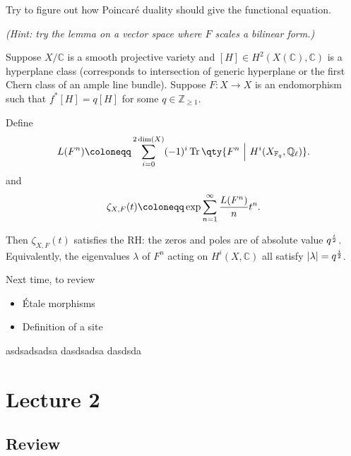 \begin{exercise}

Try to figure out how Poincaré duality should give the functional
equation.

\emph{(Hint: try the lemma on a vector space where \(F\) scales a
bilinear form.)}

\end{exercise}

\begin{theorem}

Suppose \(X/{\mathbb{C}}\) is a smooth projective variety and
\([H] \in H^2(X({\mathbb{C}}), {\mathbb{C}})\) is a hyperplane class
(corresponds to intersection of generic hyperplane or the first Chern
class of an ample line bundle). Suppose \(F:X\to X\) is an endomorphism
such that \(f^*[H] = q[H]\) for some \(q\in {\mathbb{Z}}_{\geq 1}\).

Define
\begin{align*}  
L(F^n) \coloneqq
\sum_{i=0}^{2\dim(X)} (-1)^i \operatorname{Tr}\qty{ F^n {~\mathrel{\Big|}~}H^i(X_{{\mathbb{F}}_q}, {\mathbb{Q}}_\ell)}
.\end{align*}
and
\begin{align*}  
\zeta_{X, F}(t) \coloneqq
\exp{\sum_{n=1}^\infty {L(F^n) \over n}t^n }
.\end{align*}

Then \(\zeta_{X, F}(t)\) satisfies the RH: the zeros and poles are of
absolute value \(q^{i\over 2}\). Equivalently, the eigenvalues
\(\lambda\) of \(F^n\) acting on \(H^i(X, {\mathbb{C}})\) all satisfy
\({\left\lvert {\lambda} \right\rvert} = q^{i\over 2}\).

\end{theorem}

Next time, to review

\begin{itemize}
\tightlist
\item
  Étale morphisms
\item
  Definition of a site
\end{itemize}

asdsadsadsa dasdsadsa dasdsda

\hypertarget{lecture-2}{%
\section{Lecture 2}\label{lecture-2}}

\hypertarget{review}{%
\subsection{Review}\label{review}}

